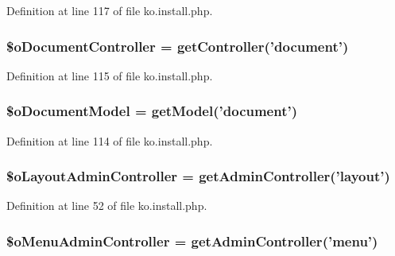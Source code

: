 Definition at line 117 of file ko.\+install.\+php.

\hypertarget{ko_8install_8php_aac43fce682d4b7a05df6d3e44c2c54e6}{
\subsubsection[{\$o\+Document\+Controller}]{\setlength{\rightskip}{0pt plus 5cm}\$o\+Document\+Controller = {\bf get\+Controller}('{\bf document}')}}\label{ko_8install_8php_aac43fce682d4b7a05df6d3e44c2c54e6}


Definition at line 115 of file ko.\+install.\+php.

\hypertarget{ko_8install_8php_afb18aa87e5520385e76377e876e042af}{
\subsubsection[{\$o\+Document\+Model}]{\setlength{\rightskip}{0pt plus 5cm}\$o\+Document\+Model = {\bf get\+Model}('{\bf document}')}}\label{ko_8install_8php_afb18aa87e5520385e76377e876e042af}


Definition at line 114 of file ko.\+install.\+php.

\hypertarget{ko_8install_8php_a6a03496003da7df71cf94d9accb430be}{
\subsubsection[{\$o\+Layout\+Admin\+Controller}]{\setlength{\rightskip}{0pt plus 5cm}\$o\+Layout\+Admin\+Controller = {\bf get\+Admin\+Controller}('{\bf layout}')}}\label{ko_8install_8php_a6a03496003da7df71cf94d9accb430be}


Definition at line 52 of file ko.\+install.\+php.

\hypertarget{ko_8install_8php_a9062530c3b03479ca4530daee1c18887}{
\subsubsection[{\$o\+Menu\+Admin\+Controller}]{\setlength{\rightskip}{0pt plus 5cm}\$o\+Menu\+Admin\+Controller = {\bf get\+Admin\+Controller}('{\bf menu}')}}\label{ko_8install_8php_a9062530c3b03479ca4530daee1c18887}


